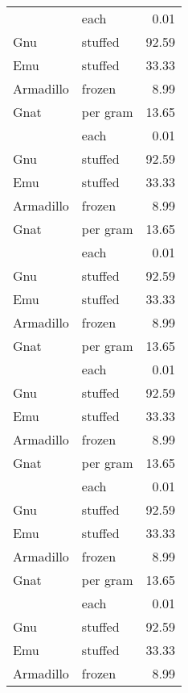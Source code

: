 {\begin{center}
\begin{xtabular}{llr}
                                & each     & 0.01  \\
Gnu       & stuffed  & 92.59 \\
Emu                             & stuffed  & 33.33 \\
Armadillo & frozen   & 8.99  \\
Gnat                            & per gram & 13.65 \\
          & each     & 0.01  \\
Gnu                             & stuffed  & 92.59 \\
Emu       & stuffed  & 33.33 \\
Armadillo                       & frozen   & 8.99  \\
Gnat      & per gram & 13.65 \\
                                & each     & 0.01  \\
Gnu       & stuffed  & 92.59 \\
Emu                             & stuffed  & 33.33 \\
Armadillo & frozen   & 8.99  \\
Gnat                            & per gram & 13.65 \\
          & each     & 0.01  \\
Gnu                             & stuffed  & 92.59 \\
Emu       & stuffed  & 33.33 \\
Armadillo                       & frozen   & 8.99  \\
Gnat      & per gram & 13.65 \\
                                & each     & 0.01  \\
Gnu       & stuffed  & 92.59 \\
Emu                             & stuffed  & 33.33 \\
Armadillo & frozen   & 8.99  \\
Gnat                            & per gram & 13.65 \\
          & each     & 0.01  \\
Gnu                             & stuffed  & 92.59 \\
Emu       & stuffed  & 33.33 \\
Armadillo                       & frozen   & 8.99  \\
\end{xtabular}
\end{center}
} 
